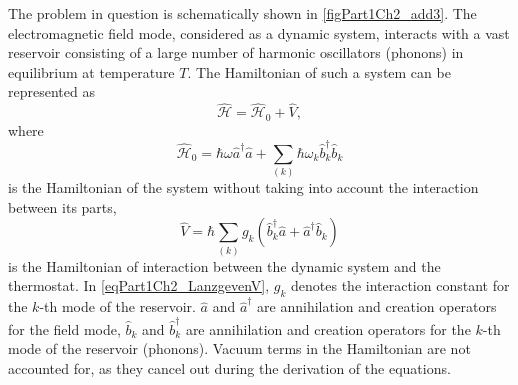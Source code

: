 The problem in question is schematically shown in
\autoref{figPart1Ch2_add3}. The electromagnetic field mode, considered as a dynamic system, interacts with a vast reservoir consisting of a large number of harmonic oscillators (phonons) in equilibrium at temperature $T$. The Hamiltonian of such a system can be represented as
\begin{equation}
\hat{\mathcal{H}} = \hat{\mathcal{H}}_0 + \hat{V},
\nonumber
\end{equation}
where
\begin{equation}
 \hat{\mathcal{H}}_0 = \hbar\omega \hat{a}^{\dag}\hat{a} +
\sum_{(k)} \hbar\omega_k \hat{b}_k^{\dag} \hat{b}_k
\nonumber
\end{equation}
is the Hamiltonian of the system without taking into account the interaction between its parts,
\begin{equation}
 \hat{V} = \hbar \sum_{(k)}g_k\left(
\hat{b}_k^{\dag}\hat{a} + \hat{a}^{\dag}\hat{b}_k
\right)
\label{eqPart1Ch2_LanzgevenV}
\end{equation}
is the Hamiltonian of interaction between the dynamic system and the thermostat. In \eqref{eqPart1Ch2_LanzgevenV}, $g_k$ denotes the interaction constant for the $k$-th mode of the reservoir. $\hat{a}$ and $\hat{a}^{\dag}$ are annihilation and creation operators for the field mode, $\hat{b}_k$ and $\hat{b}_{k}^{\dag}$ are annihilation and creation operators for the $k$-th mode of the reservoir (phonons). Vacuum terms in the Hamiltonian are not accounted for, as they cancel out during the derivation of the equations.

